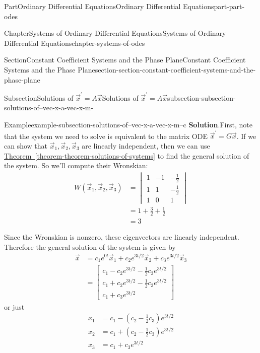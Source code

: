 \documentclass[twoside,10pt,]{book}
\newcommand{\blocktitlefont}{\relax}
\newcommand{\xreffont}{\relax}
\numberwithin{equation}{part}
\newcommand{\parens}[1]{\left( #1 \right)}
\begin{document}
\begin{partptx}{Part}{Ordinary Differential Equations}{}{Ordinary Differential Equations}{}{}{part-part-odes}
\begin{chapterptx}{Chapter}{Systems of Ordinary Differential Equations}{}{Systems of Ordinary Differential Equations}{}{}{chapter-systems-of-odes}
\begin{sectionptx}{Section}{Constant Coefficient Systems and the Phase Plane}{}{Constant Coefficient Systems and the Phase Plane}{}{}{section-section-constant-coefficient-systems-and-the-phase-plane}
\begin{subsectionptx}{Subsection}{Solutions of \(\vec{x}^\prime = A\vec{x}\)}{}{Solutions of \(\vec{x}^\prime = A\vec{x}\)}{}{}{subsection-subsection-solutions-of--vec-x-a-vec-x-m-}
\begin{example}{Example}{}{example-subsection-solutions-of--vec-x-a-vec-x-m--c}
\noindent\textbf{\blocktitlefont Solution}.\hypertarget{solution-subsection-solutions-of--vec-x-a-vec-x-m--c-b}{}\quad{}First, note that the system we need to solve is equivalent to the matrix ODE \(\vec{x}^\prime = G\vec{x}\). If we can show that \(\vec{x}_{1},\vec{x}_{2},\vec{x}_{3}\) are linearly independent, then we can use \hyperref[theorem-theorem-solutions-of-systems]{Theorem~{\xreffont\ref{theorem-theorem-solutions-of-systems}}} to find the general solution of the system. So we'll compute their Wronskian:%
\begin{align*}
W(\vec{x}_{1},\vec{x}_{2},\vec{x}_{3}) & = \begin{vmatrix} 1  &  -1  &  -\frac{1}{2} \\ 1 &  1 &  -\frac{1}{2} \\ 1 &  0 &  1\end{vmatrix}\\
& = 1+\frac{3}{2}+\frac{1}{2}\\
& = 3
\end{align*}
%
\par
Since the Wronskian is nonzero, these eigenvectors are linearly independent. Therefore the general solution of the system is given by%
\begin{align*}
\vec{x} & = c_{1}e^{0t}\vec{x}_{1}+c_{2}e^{3t/2}\vec{x}_{2}+c_{3}e^{3t/2}\vec{x}_{3}\\
& = \begin{bmatrix}c_{1}-c_{2}e^{3t/2}-\frac{1}{2}c_{3}e^{3t/2} \\ c_{1}+c_{2}e^{3t/2}-\frac{1}{2}c_{3}e^{3t/2} \\ c_{1}+c_{3}e^{3t/2}\end{bmatrix}
\end{align*}
or just%
\begin{align*}
x_{1} & = c_{1}-\parens{c_{2}-\frac{1}{2}c_{3}}e^{3t/2}\\
x_{2} & = c_{1}+\parens{c_{2}-\frac{1}{2}c_{3}}e^{3t/2}\\
x_{3} & = c_{1}+c_{3}e^{3t/2}
\end{align*}
%
\end{example}
\end{subsectionptx}
%
%
\typeout{************************************************}
\typeout{************************************************}
%

\end{sectionptx}
\end{chapterptx}
\end{partptx}
\end{document}
